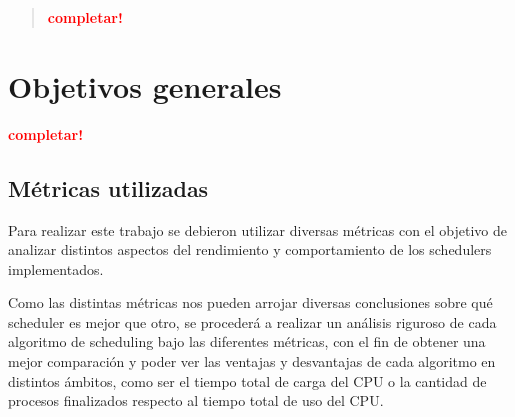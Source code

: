 \documentclass[a4paper]{article}
\begin{document}

\thispagestyle{empty}

\maketitle
\newpage

\thispagestyle{empty}
\vfill
\begin{abstract}
    \vspace{0.5cm}
    \textcolor{red}{\textbf{completar!}}
\end{abstract}

\thispagestyle{empty}
\vspace{1.5cm}
\tableofcontents
\newpage


\newpage
\tableofcontents

\section{Objetivos generales}
\textcolor{red}{\textbf{completar!}}

\subsection{Métricas utilizadas}
Para realizar este trabajo se debieron utilizar diversas métricas con el
objetivo de analizar distintos aspectos del rendimiento y comportamiento de
los schedulers implementados.

Como las distintas métricas nos pueden arrojar diversas conclusiones sobre
qué scheduler es mejor que otro, se procederá a realizar un análisis
riguroso de cada algoritmo de scheduling bajo las diferentes métricas, con
el fin de obtener una mejor comparación y poder ver las ventajas y
desvantajas de cada algoritmo en distintos ámbitos, como ser el tiempo total
de carga del CPU o la cantidad de procesos finalizados respecto al tiempo
total de uso del CPU.
\end{document}
